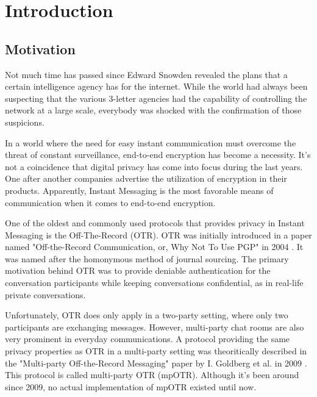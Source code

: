 \chapter{Introduction}

\label{chapter:introduction}

\newcommand{\dhname}{Diffie--Hellman }
\newcommand{\tdhname}{Triple Diffie--Hellman }



\section{Motivation}
Not much time has passed since Edward Snowden revealed the plans that a certain intelligence agency has for the internet. While the world had always been suspecting that the various 3-letter agencies had the capability of controlling the network at a large scale, everybody was shocked with the confirmation of those suspicions.

In a world where the need for easy instant communication must overcome the threat of constant surveillance, end-to-end encryption has become a necessity. It's not a coincidence that digital privacy has come into focus during the last years. One after another companies advertise the utilization of encryption in their products. Apparently, Instant Messaging is the most favorable means of communication when it comes to end-to-end encryption.

One of the oldest and commonly used protocols that provides privacy in Instant Messaging is the Off-The-Record (OTR). OTR was initially introduced in a paper named "Off-the-Record Communication, or, Why Not To Use PGP" in 2004 \cite{otr}. It was named after the homonymous method of journal sourcing. The primary motivation behind OTR was to provide deniable authentication for the conversation participants while keeping conversations confidential, as in real-life private conversations.

Unfortunately, OTR does only apply in a two-party setting, where only two participants are exchanging messages. However, multi-party chat rooms are also very prominent in everyday communications. A protocol providing the same privacy properties as OTR in a multi-party setting was theoritically described in the "Multi-party Off-the-Record Messaging" paper by I. Goldberg et al. in 2009 \cite{mpotr}. This protocol is called multi-party OTR (mpOTR). Although it's been around since 2009, no actual implementation of mpOTR existed until now.

